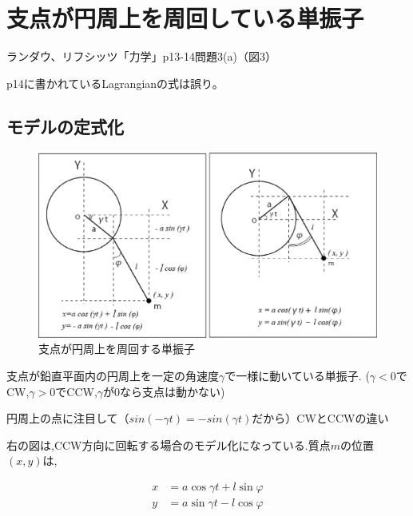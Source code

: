 \chapter{支点が円周上を周回している単振子}

ランダウ、リフシッツ「力学」p13-14問題3(a)（図3）

p14に書かれているLagrangianの式は誤り。

\section{モデルの定式化}

    \begin{figure}[htbp]
        \begin{minipage}[b]{0.45\linewidth}
          \centering
          \includegraphics[keepaspectratio, scale=0.5]{eps/circular.eps}
          \caption{支点が円周上を周回する単振子}
        \end{minipage}
      \end{figure}

支点が鉛直平面内の円周上を一定の角速度$\gamma$で一様に動いている単振子. ($\gamma<0$でCW,$\gamma>0$でCCW,$\gamma$が$0$なら支点は動かない)

円周上の点に注目して（$sin(-\gamma t)  = -sin(\gamma t)$だから）CWとCCWの違い

右の図は,CCW方向に回転する場合のモデル化になっている.質点$m$の位置$(x,y)$は,

\begin{align*}
   x&=a\cos\gamma t + l\sin\varphi\\
   y&=a\sin\gamma t - l\cos\varphi
\end{align*}

